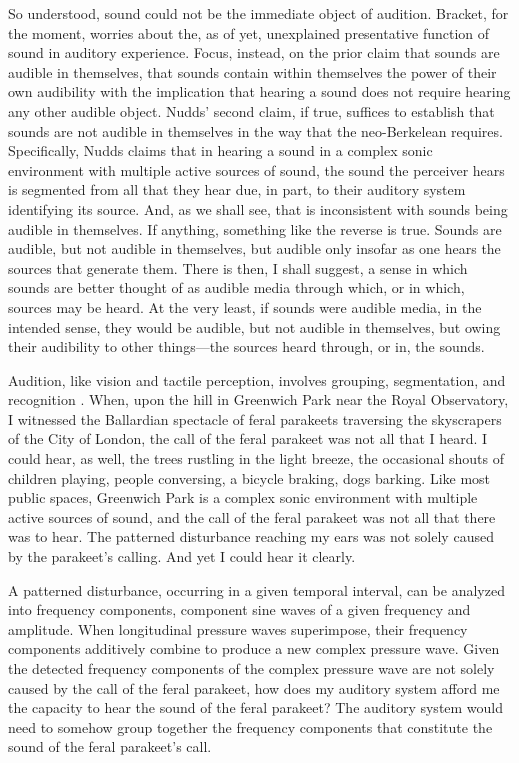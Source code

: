 So understood, sound could not be the immediate object of audition. Bracket, for the moment, worries about the, as of yet, unexplained presentative function of sound in auditory experience. Focus, instead, on the prior claim that sounds are audible in themselves, that sounds contain within themselves the power of their own audibility with the implication that hearing a sound does not require hearing any other audible object. Nudds' second claim, if true, suffices to establish that sounds are not audible in themselves in the way that the neo-Berkelean requires. Specifically, Nudds claims that in hearing a sound in a complex sonic environment with multiple active sources of sound, the sound the perceiver hears is segmented from all that they hear due, in part, to their auditory system identifying its source. And, as we shall see, that is inconsistent with sounds being audible in themselves. If anything, something like the reverse is true. Sounds are audible, but not audible in themselves, but audible only insofar as one hears the sources that generate them. There is then, I shall suggest, a sense in which sounds are better thought of as audible media through which, or in which, sources may be heard. At the very least, if sounds were audible media, in the intended sense, they would be audible, but not audible in themselves, but owing their audibility to other things---the sources heard through, or in, the sounds.

Audition, like vision and tactile perception, involves grouping, segmentation, and recognition \citep{Bregman:1990aa}. When, upon the hill in Greenwich Park near the Royal Observatory, I witnessed the Ballardian spectacle of feral parakeets traversing the skyscrapers of the City of London, the call of the feral parakeet was not all that I heard. I could hear, as well, the trees rustling in the light breeze, the occasional shouts of children playing, people conversing, a bicycle braking, dogs barking. Like most public spaces, Greenwich Park is a complex sonic environment with multiple active sources of sound, and the call of the feral parakeet was not all that there was to hear. The patterned disturbance reaching my ears was not solely caused by the parakeet's calling. And yet I could hear it clearly.

A patterned disturbance, occurring in a given temporal interval, can be analyzed into frequency components, component sine waves of a given frequency and amplitude. When longitudinal pressure waves superimpose, their frequency components additively combine to produce a new complex pressure wave. Given the detected frequency components of the complex pressure wave are not solely caused by the call of the feral parakeet, how does my auditory system afford me the capacity to hear the sound of the feral parakeet? The auditory system would need to somehow group together the frequency components that constitute the sound of the feral parakeet's call.

